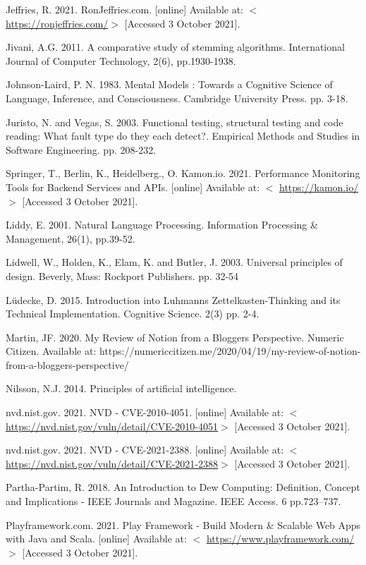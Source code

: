 \documentclass{article}
\begin{document}
{Jeffries, R. 2021. RonJeffries.com. [online] Available at: $<$ \url{https://ronjeffries.com/}$>$ [Accessed 3 October 2021].

Jivani, A.G. 2011. A comparative study of stemming algorithms. International Journal of Computer Technology, 2(6), pp.1930-1938.

Johnson-Laird, P. N. 1983. Mental Models : Towards a Cognitive Science of Language, Inference, and Consciousness. Cambridge University Press. pp. 3-18.

Juristo, N. and Vegas, S. 2003. Functional testing, structural testing and code reading: What fault type do they each detect?. Empirical Methods and Studies in Software Engineering. pp. 208-232. 

Springer, T., Berlin, K., Heidelberg., O. Kamon.io. 2021. Performance Monitoring Tools for Backend Services and APIs. [online] Available at: $<$ \url{https://kamon.io/}$>$ [Accessed 3 October 2021].

Liddy, E. 2001. Natural Language Processing. Information Processing & Management, 26(1), pp.39-52.

Lidwell, W., Holden, K., Elam, K. and Butler, J. 2003. Universal principles of design. Beverly, Mass: Rockport Publishers. pp. 32-54

Lüdecke, D. 2015. Introduction into Luhmanns Zettelkasten-Thinking and its Technical Implementation. Cognitive Science. 2(3) pp. 2-4.

Martin, JF. 2020. My Review of Notion from a Bloggers Perspective. Numeric Citizen. Available at: https://numericcitizen.me/2020/04/19/my-review-of-notion-from-a-bloggers-perspective/

Nilsson, N.J. 2014. Principles of artificial intelligence.

nvd.nist.gov. 2021. NVD - CVE-2010-4051. [online] Available at: $<$ \url{https://nvd.nist.gov/vuln/detail/CVE-2010-4051}$>$ [Accessed 3 October 2021].

nvd.nist.gov. 2021. NVD - CVE-2021-2388. [online] Available at: $<$ \url{https://nvd.nist.gov/vuln/detail/CVE-2021-2388}$>$ [Accessed 3 October 2021].

Partha-Partim, R. 2018. An Introduction to Dew Computing: Definition, Concept and Implications - IEEE Journals and Magazine. IEEE Access. 6 pp.723–737. 

Playframework.com. 2021. Play Framework - Build Modern & Scalable Web Apps with Java and Scala. [online] Available at: $<$ \url{https://www.playframework.com/}$>$ [Accessed 3 October 2021].

}
\end{document}

